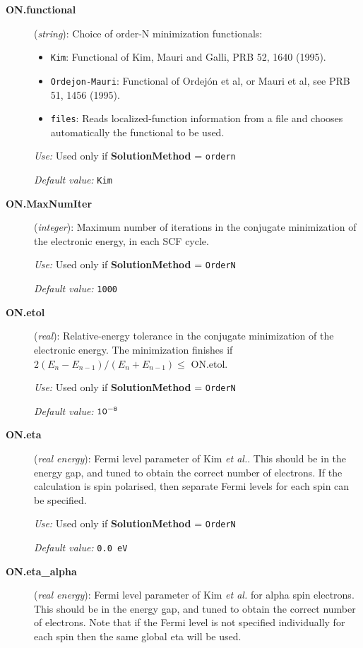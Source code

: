 \documentclass[11pt]{article}
\begin{document}
\begin{description}
\item[{\bf ON.functional}] ({\it string}): 
Choice of order-N minimization functionals: 
\begin{itemize}
\item {\tt Kim}: 
Functional of Kim, Mauri and Galli, PRB 52, 1640 (1995).
\item {\tt Ordejon-Mauri}: 
Functional of Ordej\'on et al, or Mauri et al, see PRB 51, 1456 (1995).
\item {\tt files}: 
Reads localized-function information from a file and 
chooses automatically the functional to be used. 
\end{itemize}

{\it Use:} Used only if {\bf SolutionMethod} = {\tt ordern}

{\it Default value:} {\tt Kim}

\item[{\bf ON.MaxNumIter}] ({\it integer}): 
Maximum number of iterations
in the conjugate minimization of the electronic
energy, in each SCF cycle.

{\it Use:} Used only if {\bf SolutionMethod} = {\tt OrderN}

{\it Default value:} {\tt 1000}

\item[{\bf ON.etol}] ({\it real}): 
Relative-energy tolerance in the conjugate minimization of the electronic
energy. The minimization finishes if 
\hspace{0.2truecm} $2 (E_n - E_{n-1}) / (E_n + E_{n-1}) \leq $ ON.etol.

{\it Use:} Used only if {\bf SolutionMethod} = {\tt OrderN}

{\it Default value:} ${\tt 10^{-8}}$

\item[{\bf ON.eta}] ({\it real energy}): 
Fermi level parameter of Kim 
{\it et al.}. This should be in the energy gap, and tuned to obtain
the correct number of electrons. If the calculation is spin polarised,
then separate Fermi levels for each spin can be specified.

{\it Use:} Used only if {\bf SolutionMethod} = {\tt OrderN}

{\it Default value:} {\tt 0.0 eV}

\item[{\bf ON.eta\_alpha}] ({\it real energy}): 
Fermi level parameter of Kim {\it et al.} for alpha spin electrons. 
This should be in the energy gap, and tuned to obtain
the correct number of electrons. Note that if the Fermi
level is not specified individually for each spin then the
same global eta will be used.


\end{description}
\end{document}
